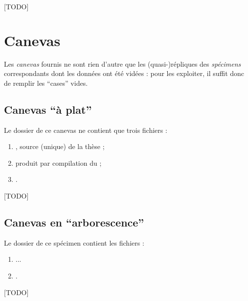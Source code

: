 [TODO]

\section{Canevas}
\label{sec-canevas}

Les \emph{canevas} fournis ne sont rien d'autre que les (quasi-)répliques des
\emph{spécimens} correspondants dont les données ont été vidées : pour les
exploiter, il suffit donc de remplir les \enquote{cases} vides.

\subsection[Canevas \enquote{à plat}]{Canevas \enquote{à plat} }
\label{sec-canevas-a-plat}

Le dossier de ce canevas ne contient que trois fichiers :
\begin{enumerate}
\item {}, source  (unique) de la thèse  ;
\item {} produit par compilation du  ;
\item {}.
\end{enumerate}

[TODO]

\subsection[Canevas en \enquote{arborescence}]{Canevas en \enquote{arborescence} }
\label{sec-canevas-arborescence}

Le dossier de ce spécimen contient les fichiers :
\begin{enumerate}
\item ...
\item {}.
\end{enumerate}

[TODO]

%
\iffalse
\fi
